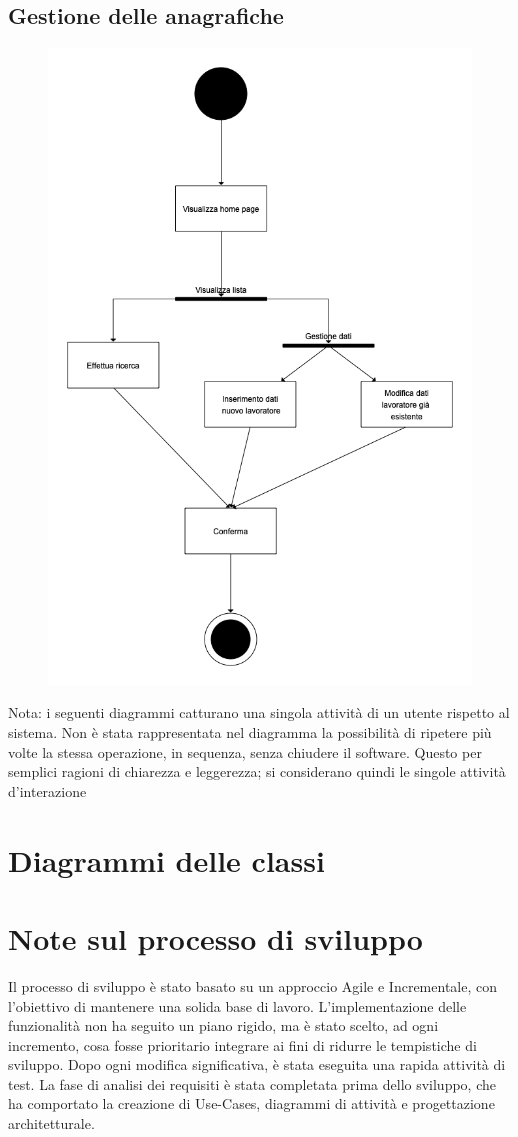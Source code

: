 \documentclass[a4paper, oneside, 12pt]{book}
\begin{document}
\newpage
\subsection{Gestione delle anagrafiche}

\begin{figure}[H]
	\centering
	\includegraphics[width = 10 cm]{images/attivitadipendenti.png}
	\label{fig:attività dipendenti}
\end{figure}

Nota: i seguenti diagrammi catturano una singola attività di un utente rispetto al sistema. Non è stata rappresentata nel diagramma la possibilità di ripetere più volte la stessa operazione, in sequenza, senza chiudere il software. Questo per semplici ragioni di chiarezza e leggerezza; si considerano quindi le singole attività d’interazione

\section{Diagrammi delle classi}%

\newpage
\section{Note sul processo di sviluppo}
Il processo di sviluppo è stato basato su un approccio Agile e Incrementale, con l'obiettivo di mantenere una solida base di lavoro. 
L'implementazione delle funzionalità non ha seguito un piano rigido, ma è stato scelto, ad ogni incremento, cosa fosse prioritario integrare
ai fini di ridurre le tempistiche di sviluppo. Dopo ogni modifica significativa, è stata eseguita una rapida attività di test. La fase di analisi 
dei requisiti è stata completata prima dello sviluppo, che ha comportato la creazione di Use-Cases, diagrammi di attività e progettazione architetturale.
\end{document}
